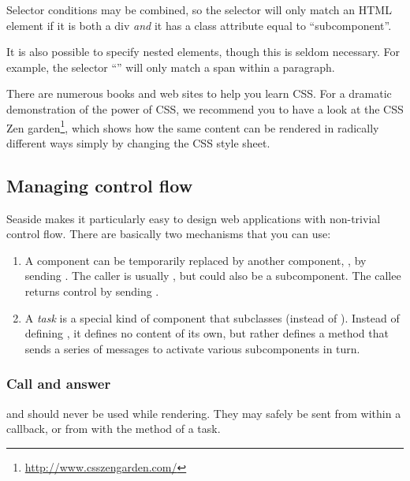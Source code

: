 \documentclass[a4paper,10pt,twoside]{book}
\begin{document}
Selector conditions may be combined, so the selector  will only match an HTML element if it is both a div \emph{and} it has a class attribute equal to ``subcomponent''.

It is also possible to specify nested elements, though this is seldom necessary.
For example, the selector ``'' will only match a span within a paragraph.

There are numerous books and web sites to help you learn CSS.
For a dramatic demonstration of the power of CSS, we recommend you to have a look at the CSS Zen garden\footnote{\url{http://www.csszengarden.com/}}, which shows how the same content can be rendered in radically different ways simply by changing the CSS style sheet.

\subsection{Managing control flow}

Seaside makes it particularly easy to design web applications with non-trivial control flow.
There are basically two mechanisms that you can use:

\begin{enumerate}
  \item A component  can be temporarily replaced by another component, , by sending .
  The caller is usually , but could also be a subcomponent.
  The callee returns control by sending .

  \item A \emph{task} is a special kind of component that subclasses  (instead of ).
  Instead of defining , it defines no content of its own, but rather defines a  method that sends a series of  messages to activate various subcomponents in turn.
\end{enumerate}

\subsubsection{Call and answer}

 and  should never be used while rendering.
They may safely be sent from within a callback, or from with the  method of a task.
\end{document}
